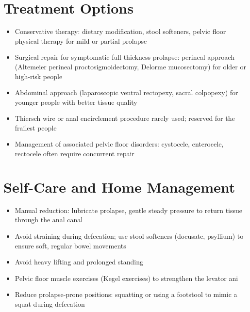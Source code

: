 \section*{Treatment Options}
\begin{itemize}
  \item Conservative therapy: dietary modification, stool softeners, pelvic floor physical therapy for mild or partial prolapse
  \item Surgical repair for symptomatic full-thickness prolapse: perineal approach (Altemeier perineal proctosigmoidectomy, Delorme mucosectomy) for older or high-risk people
  \item Abdominal approach (laparoscopic ventral rectopexy, sacral colpopexy) for younger people with better tissue quality
  \item Thiersch wire or anal encirclement procedure rarely used; reserved for the frailest people
  \item Management of associated pelvic floor disorders: cystocele, enterocele, rectocele often require concurrent repair
\end{itemize}

\section*{Self-Care and Home Management}
\begin{itemize}
  \item Manual reduction: lubricate prolapse, gentle steady pressure to return tissue through the anal canal
  \item Avoid straining during defecation; use stool softeners (docusate, psyllium) to ensure soft, regular bowel movements
  \item Avoid heavy lifting and prolonged standing
  \item Pelvic floor muscle exercises (Kegel exercises) to strengthen the levator ani
  \item Reduce prolapse-prone positions: squatting or using a footstool to mimic a squat during defecation
\end{itemize}

